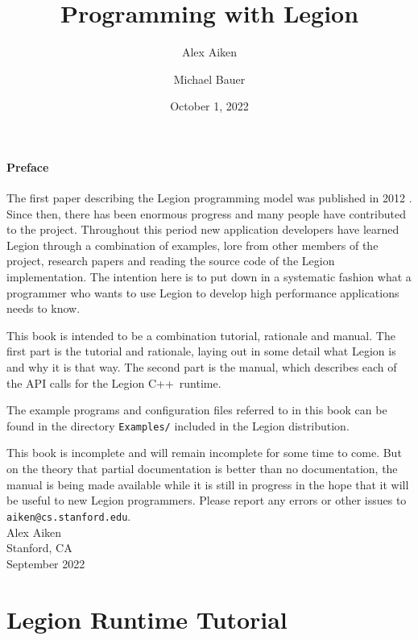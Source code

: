 \documentclass[11pt]{book}
\newcommand{\legionbook}[1]{{\tt Examples/#1}}
\newcommand{\Cpp}{C++}
\begin{document}
\title{Programming with Legion}
\author{Alex Aiken \and Michael Bauer}
\date{October 1, 2022}
\maketitle

\subsection*{Preface}

The first paper describing the Legion programming model
was published in 2012 \cite{Legion12}.  Since then, there has been
enormous progress and many people have contributed to
the project.  Throughout this period new application developers have
learned Legion through a combination of examples, lore from other
members of the project, research papers and reading the source code of
the Legion implementation.  The intention here is to put down in 
a systematic fashion what a programmer who wants to use
Legion to develop high performance applications needs to know.

This book is intended to be a combination tutorial, rationale and
manual.  The first part is the tutorial and rationale, laying out in some
detail what Legion is and why it is that way.  The second part is the manual, which describes
each of the API calls for the Legion \Cpp\ runtime.

The example programs and configuration files referred to in this book can be found in the directory
\legionbook{} included in the Legion distribution.

This book is incomplete and will remain incomplete for
some time to come.  But on the theory that partial documentation is better than no
documentation, the manual is being made available while it is
still in progress in the hope that it will be useful to new Legion
programmers.  Please report any errors or other issues to {\tt
  aiken@cs.stanford.edu}. \\[2in] Alex Aiken\\ Stanford, CA \\
September 2022

\tableofcontents

\part{Legion Runtime Tutorial}






%

%

%



\end{document}
